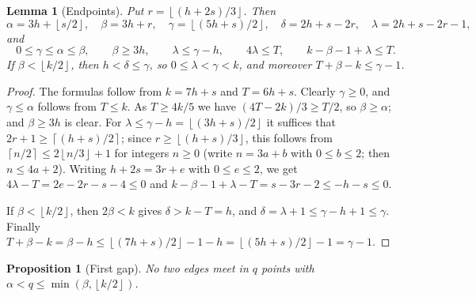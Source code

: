 \documentclass[11pt]{article}
\numberwithin{equation}{section}
\newtheorem{proposition}[theorem]{Proposition}
\newtheorem{lemma}[theorem]{Lemma}
\theoremstyle{definition}
\theoremstyle{remark}
\newcommand{\ceil}[1]{\left\lceil #1\right\rceil}
\newcommand{\floor}[1]{\left\lfloor #1\right\rfloor}
\begin{document}
\begin{lemma}[Endpoints]\label{lem:endpoints}
Put $r=\floor{(h+2s)/3}$. Then
\[
 \alpha=3h+\floor{s/2},\quad \beta=3h+r,\quad
 \gamma=\floor{(5h+s)/2},\quad \delta=2h+s-2r,\quad
 \lambda=2h+s-2r-1,
\]
and
\begin{equation}\label{eq:endpointfacts}
 0\le\gamma\le\alpha\le\beta,\qquad \beta\ge3h,\qquad
 \lambda\le\gamma-h,\qquad 4\lambda\le T,\qquad k-\beta-1+\lambda\le T .
\end{equation}
If $\beta<\floor{k/2}$, then $h<\delta\le\gamma$, so $0\le\lambda<\gamma<k$,
and moreover $T+\beta-k\le\gamma-1$.
\end{lemma}

\begin{proof}
The formulas follow from $k=7h+s$ and $T=6h+s$. Clearly $\gamma\ge0$, and
$\gamma\le\alpha$ follows from $T\le k$. As $T\ge4k/5$ we have
$(4T-2k)/3\ge T/2$, so $\beta\ge\alpha$; and $\beta\ge3h$ is clear. For
$\lambda\le\gamma-h=\floor{(3h+s)/2}$ it suffices that
$2r+1\ge\ceil{(h+s)/2}$; since $r\ge\floor{(h+s)/3}$, this follows from
$\ceil{n/2}\le2\floor{n/3}+1$ for integers $n\ge0$ (write $n=3a+b$ with
$0\le b\le2$; then $n\le4a+2$). Writing $h+2s=3r+e$ with $0\le e\le2$,
we get $4\lambda-T=2e-2r-s-4\le0$ and
$k-\beta-1+\lambda-T=s-3r-2\le-h-s\le0$.

If $\beta<\floor{k/2}$, then $2\beta<k$ gives $\delta>k-T=h$, and
$\delta=\lambda+1\le\gamma-h+1\le\gamma$. Finally
$T+\beta-k=\beta-h\le\floor{(7h+s)/2}-1-h=\floor{(5h+s)/2}-1=\gamma-1$.
\end{proof}

\begin{proposition}[First gap]\label{prop:gapone}
No two edges meet in $q$ points with $\alpha<q\le\min(\beta,\floor{k/2})$.
\end{proposition}
\end{document}

